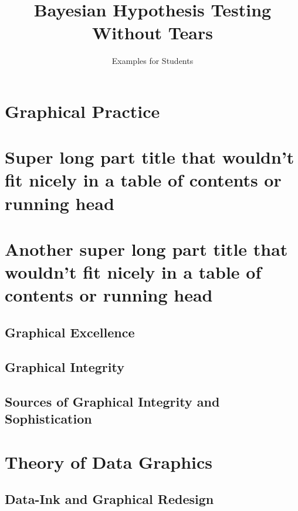 \documentclass{bayeshyp}
\title{Bayesian Hypothesis Testing Without Tears}
\subtitle{Examples for Students}
\begin{document}
\maketitle

\tableofcontents\thispagestyle{empty}

\mainmatter

\setcounter{secnumdepth}{4}

\part[image={example-image-a}]{Graphical Practice}

\part[image={example-image-b},image-options={width=0.25\textwidth},toc={Shorter part title}]{Super long part title that wouldn't fit nicely in a table of contents or running head}
\lipsum

\part[Old-style short title]{Another super long part title that wouldn't fit nicely in a table of contents or running head}

\chapter{Graphical Excellence}
\setcounter{page}{13}

\lipsum

\chapter{Graphical Integrity}
\setcounter{page}{53}

\chapter{Sources of Graphical Integrity and Sophistication}
\setcounter{page}{79}

\part{Theory of Data Graphics}

\chapter{Data-Ink and Graphical Redesign}
\setcounter{page}{91}
\end{document}
